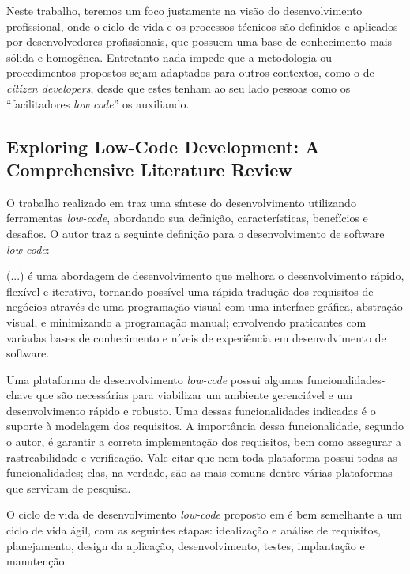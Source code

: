 	Neste trabalho, teremos um foco justamente na visão do desenvolvimento profissional, onde o ciclo de vida e os processos técnicos são definidos e aplicados por desenvolvedores profissionais, que
	possuem uma base de conhecimento mais sólida e homogênea. Entretanto nada impede que a metodologia ou procedimentos propostos sejam adaptados para outros contextos, como o de \textit{citizen developers},
	desde que estes tenham ao seu lado pessoas como os ``facilitadores \textit{low code}'' os auxiliando.

	\subsection{Exploring Low-Code Development: A Comprehensive Literature Review}

	O trabalho realizado em \cite{LowCodeExploring} traz uma síntese do desenvolvimento utilizando
	ferramentas \textit{low-code}, abordando sua definição, características, benefícios e desafios.
	O autor traz a seguinte definição para o desenvolvimento de software \textit{low-code}:

	\begin{quoting}
	\noindent (...) é uma abordagem de desenvolvimento que melhora o desenvolvimento rápido, flexível e iterativo, tornando possível
	uma rápida tradução dos requisitos de negócios através de uma programação visual com uma interface gráfica, abstração visual,
	e minimizando a programação manual; envolvendo praticantes com variadas bases de conhecimento e níveis de experiência em
	desenvolvimento de software.
	\end{quoting}

	Uma plataforma de desenvolvimento \textit{low-code} possui algumas funcionalidades-chave que são necessárias para viabilizar um
	ambiente gerenciável e um desenvolvimento rápido e robusto. Uma dessas funcionalidades indicadas é o suporte à modelagem dos requisitos. A importância dessa funcionalidade, segundo
	o autor, é garantir a correta implementação dos requisitos, bem como assegurar a rastreabilidade e verificação. Vale citar que nem toda plataforma possui todas as funcionalidades; elas, na
	verdade, são as mais comuns dentre várias plataformas que serviram de pesquisa.

	O ciclo de vida de desenvolvimento \textit{low-code} proposto em \cite{LowCodeExploring} é bem semelhante a um ciclo de vida ágil, com as seguintes etapas: idealização e análise
	de requisitos, planejamento, design da aplicação, desenvolvimento, testes, implantação e manutenção.

